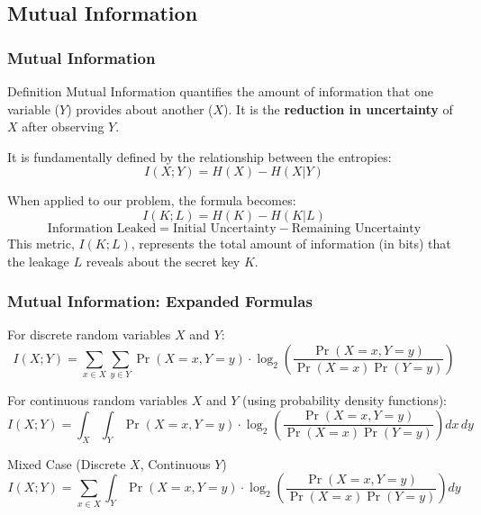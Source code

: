 \subsection{Mutual Information}
\begin{frame}
    \frametitle{Mutual Information}
    
    \begin{block}{Definition}
        Mutual Information quantifies the amount of information that one variable ($Y$) provides about another ($X$). It is the \textbf{reduction in uncertainty} of $X$ after observing $Y$.
        
        It is fundamentally defined by the relationship between the entropies:
        $$ I(X;Y) = H(X) - H(X|Y) $$
    \end{block}
    
    When applied to our problem, the formula becomes:
    $$ I(K;L) = H(K) - H(K|L) $$
    $$ \text{Information Leaked} = \text{Initial Uncertainty} - \text{Remaining Uncertainty} $$
    This metric, $I(K;L)$, represents the total amount of information (in bits) that the leakage $L$ reveals about the secret key $K$.
 
\end{frame}

\begin{frame}
    \frametitle{Mutual Information: Expanded Formulas}

    For discrete random variables $X$ and $Y$:
    $$
    I(X; Y) = \sum_{x \in X} \sum_{y \in Y} \Pr(X = x, Y = y) \cdot \log_2 \left( \frac{ \Pr(X = x, Y = y) }{ \Pr(X = x)\Pr(Y = y) } \right)
    $$


    For continuous random variables $X$ and $Y$ (using probability density functions):
    $$
    I(X; Y) = \int_{X} \int_{Y} \Pr(X = x, Y = y) \cdot \log_2 \left( \frac{ \Pr(X = x, Y = y) }{ \Pr(X = x)\Pr(Y = y) } \right) dx\,dy
    $$

    Mixed Case (Discrete $X$, Continuous $Y$)
        $$
        I(X; Y) = \sum_{x \in X} \int_{Y} \Pr(X = x, Y = y) \cdot \log_2 \left( \frac{ \Pr(X = x, Y = y) }{ \Pr(X = x)\Pr(Y = y) } \right) dy
        $$
\end{frame}


